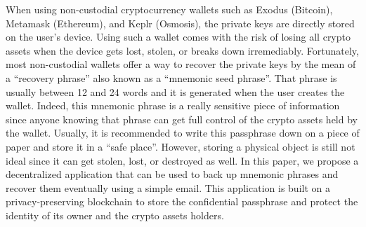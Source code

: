 When using non-custodial cryptocurrency wallets such as Exodus (Bitcoin), Metamask (Ethereum), and Keplr (Osmosis), the private keys are directly stored on the user's device. Using such a wallet comes with the risk of losing all crypto assets when the device gets lost, stolen, or breaks down irremediably. Fortunately, most non-custodial wallets offer a way to recover the private keys by the mean of a ``recovery phrase'' also known as a ``mnemonic seed phrase''. That phrase is usually between 12 and 24 words and it is generated when the user creates the wallet. Indeed, this mnemonic phrase is a really sensitive piece of information since anyone knowing that phrase can get full control of the crypto assets held by the wallet. Usually, it is recommended to write this passphrase down on a piece of paper and store it in a “safe place”. However, storing a physical object is still not ideal since it can get stolen, lost, or destroyed as well. In this paper, we propose a decentralized application that can be used to back up mnemonic phrases and recover them eventually using a simple email. This application is built on a privacy-preserving blockchain to store the confidential passphrase and protect the identity of its owner and the crypto assets holders.